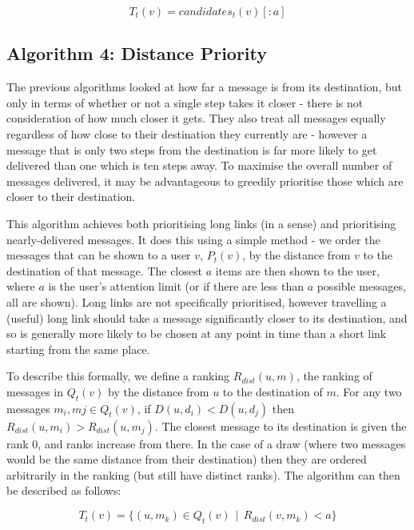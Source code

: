 \documentclass[bsc,frontabs,twoside,singlespacing,parskip,deptreport]{infthesis}     %
\begin{document}
\begin{equation}
T_{t}(v) = candidates_{t}(v)[:a]
\end{equation}

\subsection{Algorithm 4: Distance Priority}
The previous algorithms looked at how far a message is from its destination, but only in terms of whether or not a single step takes it closer - there is not consideration of how much closer it gets. They also treat all messages equally regardless of how close to their destination they currently are - however a message that is only two steps from the destination is far more likely to get delivered than one which is ten steps away. To maximise the overall number of messages delivered, it may be advantageous to greedily prioritise those which are closer to their destination.

This algorithm achieves both prioritising long links (in a sense) and prioritising nearly-delivered messages. It does this using a simple method - we order the messages that can be shown to a user $v$, $P_{t}(v)$, by the distance from $v$ to the destination of that message. The closest $a$ items are then shown to the user, where $a$ is the user's attention limit (or if there are less than $a$ possible messages, all are shown). Long links are not specifically prioritised, however travelling a (useful) long link should take a message significantly closer to its destination, and so is generally more likely to be chosen at any point in time than a short link starting from the same place.

To describe this formally, we define a ranking $R_{dist}(u, m)$, the ranking of messages in $Q_{t}(v)$ by the distance from $u$ to the destination of $m$. For any two messages $m_{i}, m{j} \in Q_{t}(v)$, if $D(u, d_{i}) < D(u, d_{j})$ then $R_{dist}(u, m_{i}) > R_{dist}(u, m_{j})$. The closest message to its destination is given the rank 0, and ranks increase from there. In the case of a draw (where two messages would be the same distance from their destination) then they are ordered arbitrarily in the ranking (but still have distinct ranks). The algorithm can then be described as follows:

\begin{equation}
T_{t}(v) = \{ (u, m_{k}) \in Q_{t}(v) \:\: | \:\: R_{dist}(v, m_{k}) < a \}
\end{equation}
\end{document}
